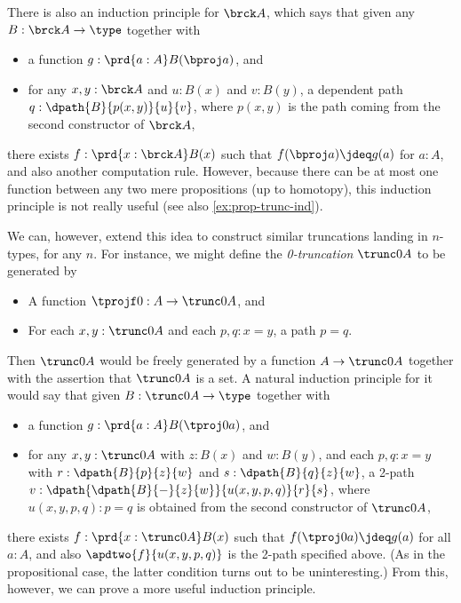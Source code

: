 %
There is also an induction principle for $\brck A$, which says that given any $B:\brck A \to \type$ together with
\begin{itemize}
\item a function $g:\prd{a:A} B(\bproj a)$, and
\item for any $x,y:\brck A$ and $u:B(x)$ and $v:B(y)$, a dependent path $q:\dpath{B}{p(x,y)}{u}{v}$, where $p(x,y)$ is the path coming from the second constructor of $\brck A$,
\end{itemize}
there exists $f:\prd{x:\brck A} B(x)$ such that $f(\bproj a)\jdeq g(a)$ for $a:A$, and also another computation rule.
However, because there can be at most one function between any two mere propositions (up to homotopy), this induction principle is not really useful (see also \cref{ex:prop-trunc-ind}).

%
%

%
We can, however, extend this idea to construct similar truncations landing in $n$-types, for any $n$.
For instance, we might define the \emph{0-trun\-ca\-tion} $\trunc0A$ to be generated by
\begin{itemize}
\item A function $\tprojf0 : A \to \trunc0 A$, and
\item For each $x,y:\trunc0A$ and each $p,q:x=y$, a path $p=q$.
\end{itemize}
Then $\trunc0A$ would be freely generated by a function $A\to \trunc0A$ together with the assertion that $\trunc0A$ is a set.
A natural induction principle for it would say that given $B:\trunc0 A \to \type$ together with
\begin{itemize}
\item a function $g:\prd{a:A} B(\tproj0a)$, and
\item for any $x,y:\trunc0A$ with $z:B(x)$ and $w:B(y)$, and each $p,q:x=y$ with $r:\dpath{B}{p}{z}{w}$ and $s:\dpath{B}{q}{z}{w}$, a 2-path $v:\dpath{\dpath{B}{-}{z}{w}}{u(x,y,p,q)}{r}{s}$, where $u(x,y,p,q):p=q$ is obtained from the second constructor of $\trunc0A$,
\end{itemize}
there exists $f:\prd{x:\trunc0A} B(x)$ such that $f(\tproj0a)\jdeq g(a)$ for all $a:A$, and also $\apdtwo{f}{u(x,y,p,q)}$ is the 2-path specified above.
(As in the propositional case, the latter condition turns out to be uninteresting.)
From this, however, we can prove a more useful induction principle.

